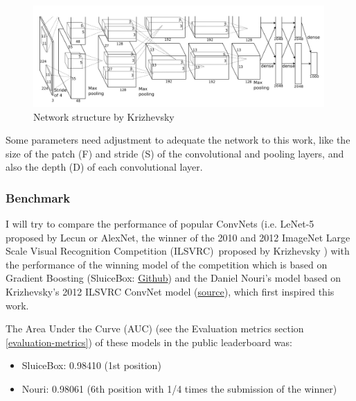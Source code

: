 \documentclass[]{article}
\newcommand{\imagenet}{ImageNet Large Scale Visual Recognition Competition (ILSVRC)}
\begin{document}
\begin{figure}[htpb!]
\centering
\includegraphics[width= 0.99\textwidth]{images/imagenet12}
\caption{Network structure by Krizhevsky \cite{Krizhevsky12} \label{img:imagenet12}}
\end{figure}

Some parameters need adjustment to adequate the network to this work, like the size of the patch (F) and stride (S) of the convolutional and pooling layers, and also the depth (D) of each convolutional layer. %

\subsubsection{Benchmark}\label{benchmark}

I will try to compare the performance of popular ConvNets (i.e. LeNet-5 proposed by Lecun \cite{Lecun98} or AlexNet, the winner of the 2010 and 2012 \imagenet \, proposed by Krizhevsky \cite{Krizhevsky12}) with the performance of the winning model of the competition which is based on Gradient Boosting (SluiceBox: \href{https://github.com/nmkridler/moby}{Github}) and the Daniel Nouri's model based on Krizhevsky's 2012 ILSVRC ConvNet model \cite{Krizhevsky12} (\href{https://speakerdeck.com/dnouri/practical-deep-neural-nets-for-detecting-marine-mammals/}{source}), which first inspired this work.

The Area Under the Curve (AUC) (see the Evaluation metrics section \ref{evaluation-metrics}) of these models in the public leaderboard was:
\begin{itemize}
	\item SluiceBox: 0.98410 (1st position)
	\item Nouri: 0.98061 (6th position with 1/4 times the submission of the winner)
\end{itemize}
\end{document}
